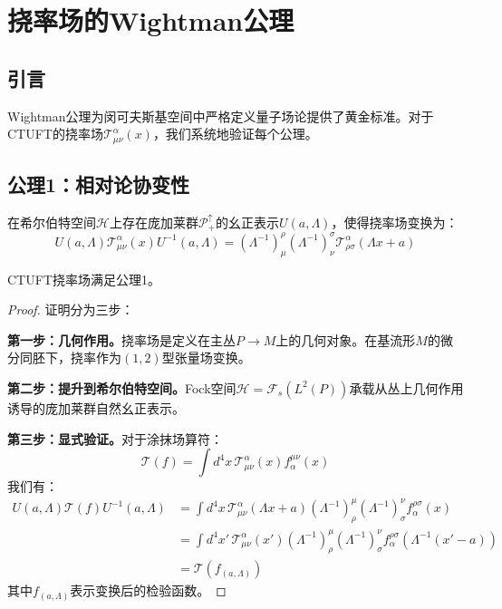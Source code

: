 \section{挠率场的Wightman公理}
\label{sec:wightman}

\subsection{引言}

Wightman公理\cite{wightman1964}为闵可夫斯基空间中严格定义量子场论提供了黄金标准。对于CTUFT的挠率场$\mathcal{T}^\alpha_{\mu\nu}(x)$，我们系统地验证每个公理。

\subsection{公理1：相对论协变性}

\begin{axiom}[相对论协变性]
在希尔伯特空间$\mathcal{H}$上存在庞加莱群$\mathcal{P}_+^\uparrow$的幺正表示$U(a, \Lambda)$，使得挠率场变换为：
\begin{equation}
    U(a, \Lambda) \mathcal{T}^\alpha_{\mu\nu}(x) U^{-1}(a, \Lambda) = (\Lambda^{-1})^\rho_\mu (\Lambda^{-1})^\sigma_\nu \mathcal{T}^\alpha_{\rho\sigma}(\Lambda x + a)
\end{equation}
\end{axiom}

\begin{theorem}[协变性验证]
CTUFT挠率场满足公理1。
\end{theorem}

\begin{proof}
证明分为三步：

\textbf{第一步：几何作用。}挠率场是定义在主丛$P \to M$上的几何对象。在基流形$M$的微分同胚下，挠率作为$(1,2)$型张量场变换。

\textbf{第二步：提升到希尔伯特空间。}Fock空间$\mathcal{H} = \mathcal{F}_s(L^2(P))$承载从丛上几何作用诱导的庞加莱群自然幺正表示。

\textbf{第三步：显式验证。}对于涂抹场算符：
\begin{equation}
    \mathcal{T}(f) = \int d^4x \, \mathcal{T}^\alpha_{\mu\nu}(x) f_\alpha^{\mu\nu}(x)
\end{equation}
我们有：
\begin{align}
    U(a, \Lambda) \mathcal{T}(f) U^{-1}(a, \Lambda) &= \int d^4x \, \mathcal{T}^\alpha_{\mu\nu}(\Lambda x + a) (\Lambda^{-1})^\mu_\rho (\Lambda^{-1})^\nu_\sigma f_\alpha^{\rho\sigma}(x) \\
    &= \int d^4x' \, \mathcal{T}^\alpha_{\mu\nu}(x') (\Lambda^{-1})^\mu_\rho (\Lambda^{-1})^\nu_\sigma f_\alpha^{\rho\sigma}(\Lambda^{-1}(x' - a)) \\
    &= \mathcal{T}(f_{(a,\Lambda)})
\end{align}
其中$f_{(a,\Lambda)}$表示变换后的检验函数。
\end{proof}

